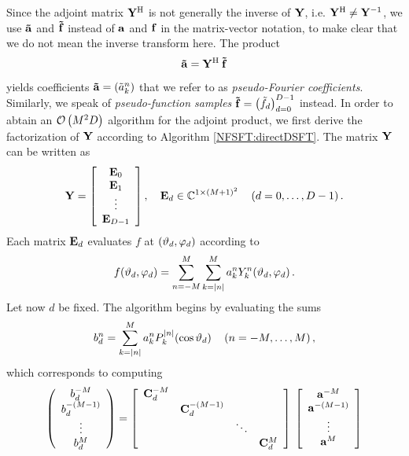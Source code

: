 Since the adjoint matrix $\mathbf{Y}^{\text{\rm{H}}}$ is not generally the inverse of $\mathbf{Y}$, i.e. $\mathbf{Y}^{\text{\rm{H}}} \neq \mathbf{Y}^{-1}$, we use $\mathbf{\tilde{a}}$ and $\mathbf{\tilde{f}}$ instead of $\mathbf{a}$ and $\mathbf{f}$ in the matrix-vector notation, to make clear 
that we do not mean the inverse transform here. The product
\[
  \mathbf{\tilde{a}} = \mathbf{Y}^{\text{\rm{H}}} \: \mathbf{\tilde{f}}
\]
yields coefficients $\mathbf{\tilde{a}} = \left(\tilde{a}_{k}^n\right)$ that 
we refer to as \emph{pseudo-Fourier coefficients}. Similarly, we speak of
\emph{pseudo-function samples} $\mathbf{\tilde{f}} = \left(\tilde{f}_{d}\right)_{d=0}^{D-1}$ instead.
In order to abtain an $\mathcal{O}\left(M^2D\right)$ algorithm for the adjoint product, 
we first derive the factorization of $\mathbf{Y}$ according to Algorithm 
\ref{NFSFT:directDSFT}. The matrix $\mathbf{Y}$ can be written as
\[
  \mathbf{Y} = 
    \left[\begin{array}{c}
      \mathbf{E}_{0}\\
      \mathbf{E}_{1}\\
      \vdots\\
      \mathbf{E}_{D-1}
    \end{array}\right], \quad \mathbf{E}_{d} \in \mathbb{C}^{1 \times (M+1)^2} \quad \left(d=0,\ldots,D-1\right).
\]
Each matrix $\mathbf{E}_{d}$ evaluates $f$ at $\left(\vartheta_{d},\varphi_{d}\right)$ according to 
\[
  f{\hspace{-0.4ex}}\left(\vartheta_{d},\varphi_{d}\right) = \sum_{n=-M}^M \sum_{k=\left\vert n\right\vert}^M a_k^n Y_{k}^n{\hspace{-0.4ex}}\left(\vartheta_{d},\varphi_{d}\right).
\]
Let now $d$ be fixed. The algorithm begins by evaluating the sums
\[
  b^{n}_{d} = \sum_{k=\left\vert n\right\vert}^M a_{k}^n P_{k}^{\left\vert n\right\vert}{\hspace{-0.4ex}}\left(\cos\vartheta_{d}\right) \quad \left(n=-M,\ldots,M\right), 
\]
which corresponds to computing
\[
  \left(\begin{array}{c}
    b^{-M}_{d}\\
    b^{-(M-1)}_{d}\\
    \vdots\\
    b^{M}_{d}
  \end{array}\right)
  =
  \left[\begin{array}{cccc}
    \mathbf{C}^{-M}_{d} &                    &        &               \\
                   & \mathbf{C}^{-(M-1)}_{d} &        &               \\
                   &                    & \ddots &               \\
                   &                    &        & \mathbf{C}^{M}_{d} 
  \end{array}\right]
  \:
  \left[\begin{array}{c}
    \mathbf{a}^{-M}\\
    \mathbf{a}^{-(M-1)}\\
    \vdots\\
    \mathbf{a}^{M}
  \end{array}\right]
\]
